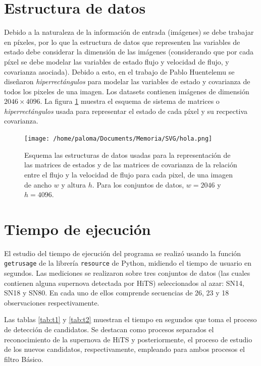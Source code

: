 \section{Estructura de datos}
\label{des:struct}
Debido a la naturaleza de la informaci\'on de entrada (im\'agenes) se debe trabajar en p\'ixeles, por lo que la estructura de datos que representen las variables de estado debe considerar la dimensi\'on de las im\'agenes (considerando que por cada p\'ixel se debe modelar las variables de estado flujo y velocidad de flujo, y covarianza asociada). Debido a esto, en el trabajo de Pablo Huentelemu \cite{huentelemu} se dise\~naron \textit{hiperrect\'angulos} para modelar las variables de estado y covarianza de todos los pixeles de una imagen. Los datasets contienen im\'agenes de dimensi\'on  $2046 \times 4096$. La figura \ref{fig:data_scheme} muestra el esquema de sistema de matrices o \textit{hiperrect\'angulos} usada para representar el estado de cada p\'ixel y su recpectiva covarianza.
\bigskip  

\begin{figure}
\centering
\texttt{[image: /home/paloma/Documents/Memoria/SVG/hola.png]}
\caption{Esquema las estructuras de datos usadas para la representaci\'on de las matrices de estados y de las matrices de covarianza de la relaci\'on entre el flujo y la velocidad de flujo para cada pixel, de una imagen de ancho $w$ y altura $h$. Para los conjuntos de datos, $w=2046$ y $h=4096$.}
\label{fig:data_scheme}
\end{figure}
\bigskip

\section{Tiempo de ejecuci\'on}

El estudio del tiempo de ejecuci\'on del programa se realiz\'o usando la funci\'on \texttt{getrusage} de la librer\'ia \texttt{resource} de Python, midiendo el tiempo de usuario en segundos. Las mediciones se realizaron sobre tres conjuntos de datos (las cuales contienen alguna supernova detectada por HiTS) seleccionados al azar: SN14, SN18 y  SN80. En cada uno de ellos comprende secuencias de 26, 23 y 18 observaciones respectivamente. 
\bigskip

Las tablas \ref{tab:t1} y \ref{tab:t2} muestran el tiempo en segundos que toma el proceso de detecci\'on de candidatos. Se destacan como procesos separados el reconocimiento de la supernova de HiTS y posteriormente, el proceso de estudio de los nuevos candidatos, respectivamente, empleando para ambos procesos el filtro B\'asico.  

